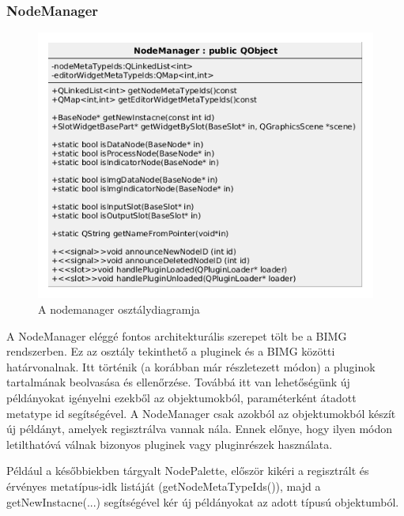 \documentclass[a4paper,12pt,oneside]{report}
\begin{document}
\subsubsection{NodeManager}
\begin{center}
\begin{figure}[h]
  \includegraphics[width=1\textwidth]{nodeman_diag.png}
  \caption{A nodemanager osztálydiagramja }

  \label{fig:bimg_node_man}
\end{figure}
\end{center}
A NodeManager eléggé fontos architekturális szerepet tölt be a BIMG rendszerben. Ez az osztály tekinthető a pluginek és a BIMG közötti határvonalnak. Itt történik (a korábban már részletezett módon) a pluginok tartalmának beolvasása és ellenőrzése. Továbbá itt van lehetőségünk új példányokat igényelni ezekből az objektumokból, paraméterként átadott metatype id segítségével. A NodeManager csak azokból az objektumokból készít új példányt, amelyek regisztrálva vannak nála. Ennek előnye, hogy ilyen módon letilthatóvá válnak bizonyos pluginek vagy pluginrészek használata.

Például a későbbiekben tárgyalt NodePalette, először kikéri a regisztrált és érvényes metatípus-idk listáját (getNodeMetaTypeIds()), majd a getNewInstacne(...) segítségével kér új példányokat az adott típusú objektumból.
\end{document}
